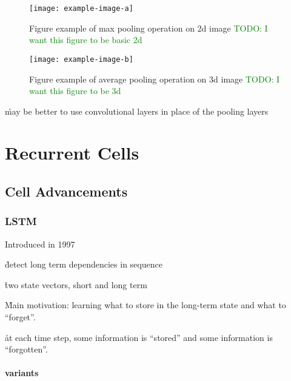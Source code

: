


\begin{figure}[htp]
	\centering
	\texttt{[image: example-image-a]}\hfil
	\caption{Figure example of max pooling operation on 2d image \textcolor{green}{TODO: I want this figure to be basic 2d}}
	\label{fig:pooling_max_2d_ex_a}
\end{figure}

\begin{figure}[htp]
	\centering
	\texttt{[image: example-image-b]}\hfil
	\caption{Figure example of average pooling operation on 3d image \textcolor{green}{TODO: I want this figure to be 3d}}
	\label{fig:pooling_avg_3d_ex_a}
\end{figure}


\r{may be better to use convolutional layers in place of the pooling layers\cite{springenberg2014striving}}

\section{Recurrent Cells}

\subsection{Cell Advancements}

\subsubsection{LSTM}


Introduced in 1997 %

\r{detect long term dependencies in sequence}

\r{two state vectors, short and long term}

\r{Main motivation: learning what to store in the long-term state and what to ``forget''.}

\r{at each time step, some information is ``stored'' and some information is ``forgotten''.}

\paragraph{variants}

